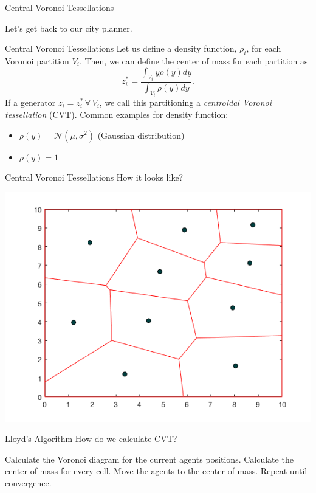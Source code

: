 \documentclass[t]{beamer}
\begin{document}
\begin{frame}[label=centvorpart1]{Central Voronoi Tessellations}
\begin{center}
Let's get back to our city planner.
\end{center}
\end{frame}
\begin{frame}[label=centvorpart2]{Central Voronoi Tessellations}
Let us define a density function, $\rho_i$, for each Voronoi partition $V_{i}$. Then, we can define the center of mass for each partition as
\begin{equation*}
z_{i}^{*} = \frac{\int_{V_{i}}y\rho(y)dy}{\int_{V_{i}}\rho(y)dy}.
\end{equation*}
If a generator $z_{i} = z_{i}^{*} \, \forall \,V_{i}$, we call this partitioning a \emph{centroidal Voronoi tessellation} (CVT).
Common examples for density function:
\begin{itemize}
\item $\rho(y) = \mathcal{N}\left( \mu, \sigma ^2 \right)$ (Gaussian distribution)
\item $\rho(y) = 1$
\end{itemize}
\end{frame}
\begin{frame}[label=centvorpart3]{Central Voronoi Tessellations}
How it looks like?
\begin{center}
\includegraphics[scale=0.5]{background/central-Voronoi-example.png}
\end{center}
\end{frame}
\begin{frame}[label=lloydsalg1]{Lloyd's Algorithm}
How do we calculate CVT?
\begin{algorithm}[H]
\caption{Lloyd's Algorithm} \label{LloydAlgo}
\begin{algorithmic}[1]
\State Calculate the Voronoi diagram for the current agents positions.
\State Calculate the center of mass for every cell.
\State Move the agents to the center of mass.
\State Repeat until convergence.
\end{algorithmic}
\end{algorithm}
\end{frame}
\end{document}
